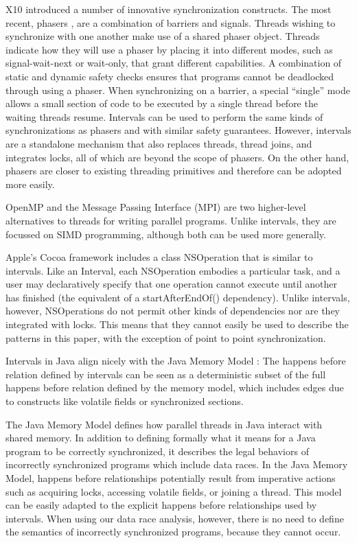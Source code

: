 X10 \cite{Charles2005, Saraswat2010} introduced a number of innovative
synchronization constructs. The most recent, phasers
\cite{Shirako2008, Shirako2010}, are a combination of barriers and
signals. Threads wishing to synchronize with one another make use of a
shared phaser object.  Threads indicate how they will use a phaser by
placing it into different modes, such as signal-wait-next or
wait-only, that grant different capabilities. A combination of static
and dynamic safety checks ensures that programs cannot be deadlocked
through using a phaser. When synchronizing on a barrier, a special
“single” mode allows a small section of code to be executed by a
single thread before the waiting threads resume. Intervals can be used
to perform the same kinds of synchronizations as phasers and with
similar safety guarantees. However, intervals are a standalone
mechanism that also replaces threads, thread joins, and integrates
locks, all of which are beyond the scope of phasers. On the other
hand, phasers are closer to existing threading primitives and
therefore can be adopted more easily.

OpenMP \cite{OpenMP2008} and the Message Passing Interface (MPI)
\cite{MPI2009} are two higher-level alternatives to threads for
writing parallel programs. Unlike intervals, they are focussed on SIMD
programming, although both can be used more generally.

Apple's Cocoa framework includes a class NSOperation \cite{Apple2008}
that is similar to intervals. Like an Interval, each NSOperation
embodies a particular task, and a user may declaratively specify that
one operation cannot execute until another has finished (the
equivalent of a startAfterEndOf() dependency). Unlike intervals,
however, NSOperations do not permit other kinds of dependencies nor
are they integrated with locks. This means that they cannot easily be
used to describe the patterns in this paper, with the exception of
point to point synchronization.

Intervals in Java align nicely with the Java Memory Model
\cite{Manson2005}: The happens before relation defined by intervals
can be seen as a deterministic subset of the full happens before
relation defined by the memory model, which includes edges due to
constructs like volatile fields or synchronized sections.

The Java Memory Model \cite{Manson2005} defines how parallel threads
in Java interact with shared memory. In addition to defining formally
what it means for a Java program to be correctly synchronized, it
describes the legal behaviors of incorrectly synchronized programs
which include data races. In the Java Memory Model, happens before
relationships potentially result from imperative actions such as
acquiring locks, accessing volatile fields, or joining a thread. This
model can be easily adapted to the explicit happens before
relationships used by intervals. When using our data race analysis,
however, there is no need to define the semantics of incorrectly
synchronized programs, because they cannot occur.


